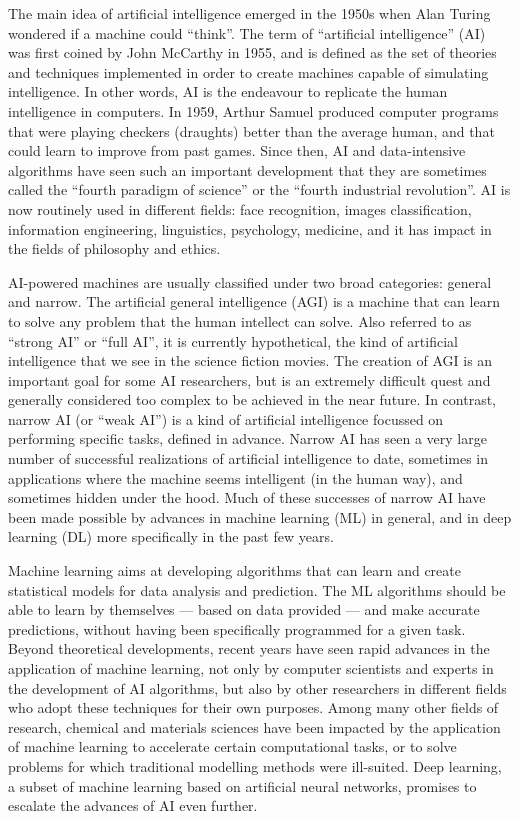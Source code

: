 \documentclass[aip,apm,amsmath,amssymb,reprint]{revtex4-2}
\begin{document}
The main idea of artificial intelligence emerged in the 1950s when Alan Turing wondered if a machine could ``think''.\cite{TURING1950} The term of ``artificial intelligence'' (AI) was first coined by John McCarthy in 1955, and is defined as the set of theories and techniques implemented in order to create machines capable of simulating intelligence. In other words, AI is the endeavour to replicate the human intelligence in computers. In 1959, Arthur Samuel produced computer programs that were playing checkers (draughts) better than the average human, and that could learn to improve from past games.\cite{Samuel1959} Since then, AI and data-intensive algorithms have seen such an important development that they are sometimes called the ``fourth paradigm of science''\cite{Hey2009} or the ``fourth industrial revolution''. AI is now routinely used in different fields: face recognition, images classification, information engineering, linguistics, psychology, medicine, and it has impact in the fields of philosophy and ethics.

AI-powered machines are usually classified under two broad categories: general and narrow. The artificial general intelligence (AGI) is a machine that can learn to solve any problem that the human intellect can solve. Also referred to as ``strong AI'' or ``full AI'', it is currently hypothetical, the kind of artificial intelligence that we see in the science fiction movies. The creation of AGI is an important goal for some AI researchers, but is an extremely difficult quest and generally considered too complex to be achieved in the near future.\cite{2007} In contrast, narrow AI (or ``weak AI'') is a kind of artificial intelligence focussed on performing specific tasks, defined in advance. Narrow AI has seen a very large number of successful realizations of artificial intelligence to date, sometimes in applications where the machine seems intelligent (in the human way), and sometimes hidden under the hood. Much of these successes of narrow AI have been made possible by advances in machine learning (ML) in general, and in deep learning (DL) more specifically in the past few years.

Machine learning aims at developing algorithms that can learn and create statistical models for data analysis and prediction. The ML algorithms should be able to learn by themselves --- based on data provided --- and make accurate predictions, without having been specifically programmed for a given task. Beyond theoretical developments, recent years have seen rapid advances in the application of machine learning, not only by computer scientists and experts in the development of AI algorithms, but also by other researchers in different fields who adopt these techniques for their own purposes. Among many other fields of research, chemical and materials sciences have been impacted by the application of machine learning to accelerate certain computational tasks, or to solve problems for which traditional modelling methods were ill-suited. Deep learning, a subset of machine learning based on artificial neural networks, promises to escalate the advances of AI even further.
\end{document}

